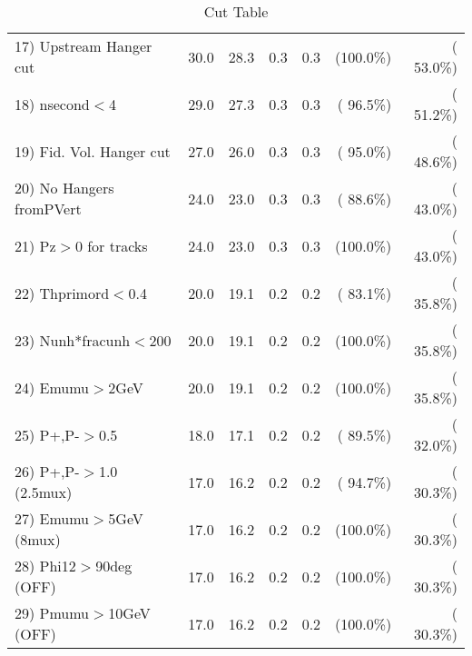 \begin{table}[h!]
\begin{tabular}{||l||r|r|r|r|r|r||}
 17) Upstream Hanger cut  &         30.0 &         28.3 &          0.3 &          0.3 & (100.0\%) & ( 53.0\%) \\
 18) nsecond$<$4          &         29.0 &         27.3 &          0.3 &          0.3 & ( 96.5\%) & ( 51.2\%) \\
 19) Fid. Vol. Hanger cut &         27.0 &         26.0 &          0.3 &          0.3 & ( 95.0\%) & ( 48.6\%) \\
 20) No Hangers fromPVert &         24.0 &         23.0 &          0.3 &          0.3 & ( 88.6\%) & ( 43.0\%) \\
 21) Pz$>$0 for tracks    &         24.0 &         23.0 &          0.3 &          0.3 & (100.0\%) & ( 43.0\%) \\
 22) Thprimord$<$0.4      &         20.0 &         19.1 &          0.2 &          0.2 & ( 83.1\%) & ( 35.8\%) \\
 23) Nunh*fracunh$<$200   &         20.0 &         19.1 &          0.2 &          0.2 & (100.0\%) & ( 35.8\%) \\
 24) Emumu$>$2GeV         &         20.0 &         19.1 &          0.2 &          0.2 & (100.0\%) & ( 35.8\%) \\
 25) P+,P-$>$0.5          &         18.0 &         17.1 &          0.2 &          0.2 & ( 89.5\%) & ( 32.0\%) \\
 26) P+,P-$>$1.0 (2.5mux) &         17.0 &         16.2 &          0.2 &          0.2 & ( 94.7\%) & ( 30.3\%) \\
 27) Emumu$>$5GeV  (8mux) &         17.0 &         16.2 &          0.2 &          0.2 & (100.0\%) & ( 30.3\%) \\
 28) Phi12$>$90deg  (OFF) &         17.0 &         16.2 &          0.2 &          0.2 & (100.0\%) & ( 30.3\%) \\
 29) Pmumu$>$10GeV  (OFF) &         17.0 &         16.2 &          0.2 &          0.2 & (100.0\%) & ( 30.3\%) \\
 \hline
 \hline
 \end{tabular}
 \caption{Cut Table           }
 \label{tab-cutcohjpsi-mumu_anuecc}
 \end{table}
